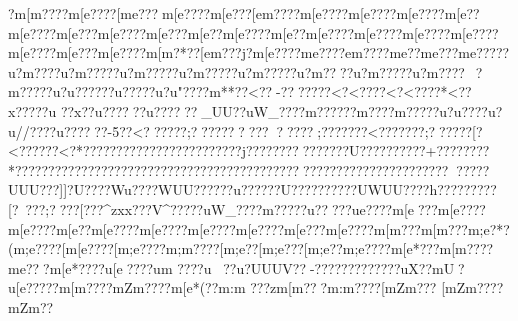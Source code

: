 {{{{{{{{{{{{{{{{{{{{{{{{{{{{{{{{{{{{{{{{{{{{{{{{{{{{{{{{{{{{{{{{{{{{{{{{{{{{{{{{{{{{{{{{{{{{{{{{{{{{{{{{{{{{{{{{{{{{{{{{{{{{{{{{{{{{{{{{{{{{{{{{{{{{{{{{{{{{{{{{{{{{{{{{{{{{{{{{{{{{{{{{{{{{{{{{{{{{{{{{{{{{{{{{{{{{{{{{{{{{{{{{{{{{{{{{{{{{{{{{{{{{{{{{{{{{{{{{{{{{{{{{{{{{{{{{{{{{{{{{{{{{{{{{{{{{{{{{{{{{{{{{{{{{{{{{{{{{{{{{{{{{{{{{{{{{{{{{{{{{{{{{{{{{{{{{{{{{{{{{{{{{{{{{{{{{{{{{{{{{{{{{{{{{{{{{{{{{{{{{{{{{{{{{{{{{{{{{{{{{{{{{{{{{{{{{{{{{{{{{{{{{{{{{{{{{{{{{{{{{{{{{{{{{{{{{{{{{{{{{{{{{{{{{{{{{{{{{{{{{{{{{{{{{{{{{{{{{{{{{{{{{{{{{{{{{{{{{{{{{{{{{{{{{{{{{{{{{{{{{{{{{{{{{{{{{{{{{{{{{{{{{{{{{{{{{{{{{{{{{{{{{{{{{{{{{{{{{{{{{{{{{{{{{{{{{{{{{{{{{{{{{{{{{{{{{{{{{{{{{{{{{{{{{{{{{{{{{{{{{{{{{{{{{{{{{{{{{{{{{{{{{{{{{{{{{{{{{{{{{{{{{{{{{{{{{{{{{{{{{{{{{{{{{{{{{{{{{{{{{{{{{{{{{{{{{{{{{{{{{{{{{{{{{{{{{{{{{{{{{{{{{{{{{{{{{{{{{{{{{{{{{{{{{{{{{{{{{{{{{{{{{{{{{{{{{{{{{{{{{{{{{{{{{{{{{{{{{{{{{{{{{{{{{{{{{{{{{{{{{{{{{{{{{{{{{{{{{{{{{{{{{{{{{{{{{{{{{{{{{{{{{{{{{{{{{{{{{{{{{{{{{{{{{{{{{{{{{{{{{{{{{{{{{{?m[m????{m[e????[m{e???{m[e????{m[e???[e{m????{m[e????{m[e????{m[e????{m[e??{m[e????{m[e???{m[e????{m[e???{m[e??{m[e????{m[e??{m[e????{m[e????{m[e????{m[e????{m[e????{m[e???{m[e????{m[m?*??[e{m???j?m[e????{m{e????{e{m????{m{e??{m{e???{m{e?????u?m????u?m?????u?m?????u?m?????u?m?????u?m????u?m?????u?m????~?m?????u?u?????}?u?????u?u "???}?m**??<??}-??\??????<?<????<?<????*<??}x????}?u ??x?}?u??????u??????}_UU?}?uW_???}?m?????}?m???}?m?????u?u????u?u//???}?u??????}-5??<??????;???????????????;???????<???????;??????[?<?????{?<?*???{?\???????{???????{?????{?{?j?????{??????{????U??{????????+????????*?????????????????????????????????????????????????????????????????  ?????UUU???]]?U???}?Wu????WUU??????u??????U??????????UWUU????h? ??{???? ??[?~??{?;????[???^zxx???}V^?????uW_???}?m?????u?}????u{e????{m[e???{m[e????{m[e????{m[e??{m[e????{m[e????{m[e????{m[e????{m[e???{m[e????{m[m???{m[m???{m;e?*?({m;e????[m[e????[m;e????{m;m????[m;e??[m;e???[m;e??{m;e????{m[e*???{m[m????{m{e???{m[e*????u[e????u{m 
???}?u??u?}UUUV??} -???}   ??????????uX??}{mU?{u[e?????m[m????{mZm????{m[e*(??{m:m ???zm[m???{m:m????[mZm???
[mZm????{mZm??
}}}}}}}}}}}}}}}}}}}}}}}}}}}}}}}}}}}}}}}}}}}}}}}}}}}}}}}}}}}}}}}}}}}}}}}}}}}}}}}}}}}}}}}}}}}}}}}}}}}}}}}}}}}}}}}}}}}}}}}}}}}}}}}}}}}}}}}}}}}}}}}}}}}}}}}}}}}}}}}}}}}}}}}}}}}}}}}}}}}}}}}}}}}}}}}}}}}}}}}}}}}}}}}}}}}}}}}}}}}}}}}}}}}}}}}}}}}}}}}}}}}}}}}}}}}}}}}}}}}}}}}}}}}}}}}}}}}}}}}}}}}}}}}}}}}}}}}}}}}}}}}}}}}}}}}}}}}}}}}}}}}}}}}}}}}}}}}}}}}}}}}}}}}}}}}}}}}}}}}}}}}}}}}}}}}}}}}}}}}}}}}}}}}}}}}}}}}}}}}}}}}}}}}}}}}}}}}}}}}}}}}}}}}}}}}}}}}}}}}}}}}}}}}}}}}}}}}}}}}}}}}}}}}}}}}}}}}}}}}}}}}}}}}}}}}}}}}}}}}}}}}}}}}}}}}}}}}}}}}}}}}}}}}}}}}}}}}}}}}}}}}}}}}}}}}}}}}}}}}}}}}}}}}}}}}}}}}}}}}}}}}}}}}}}}}}}}}}}}}}}}}}}}}}}}}}}}}}}}}}}}}}}}}}}}}}}}}}}}}}}}}}}}}}}}}}}}}}}}}}}}}}}}}}}}}}}}}}}}}}}}}}}}}}}}}}}}}}}}}}}}}}}}}}}}}}}}}}}}}}}}}}}}}}}}}}}}}}}}}}}}}}}}}}}}}}}}}}}}}}}}}}}}}}}}}}}}}}}}}}}}}}}}}}}}}}}}}}}}}}}}}}}}}}}}}}}}}}}}}}}}}}}}}}}}}}}}}}}}}}}}}}}}}}}}}}}}}}}}}}}}}}}}}}}}}}}}}}}}}}}}}}}}}}}}}}}}}}}}}}}}}}}}}}}}}}}}}}}}}}}}}}}}}}}}}}}}}}}}}}}}}}}}}}}}}}}}}}}}}}}}}}}}}}}}}}}}}}}}}}}}}}}}}}}}}}}}}}}}}}}}}}}}}}}}}}}}}}}}}}}}}}}}}}}}}}}}}}}}}}}}}
